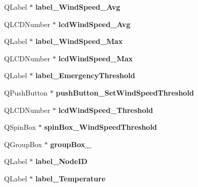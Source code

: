 \begin{DoxyCompactItemize}
Q\+Label $\ast$ {\bfseries label\+\_\+\+Wind\+Speed\+\_\+\+Avg}
\item 
\mbox{\label{class_ui___main_window_afb2874c9b07741da0a89fc4d3c407edf}} 
Q\+L\+C\+D\+Number $\ast$ {\bfseries lcd\+Wind\+Speed\+\_\+\+Avg}
\item 
\mbox{\label{class_ui___main_window_ab459580179842c31da3095ab0f04eeef}} 
Q\+Label $\ast$ {\bfseries label\+\_\+\+Wind\+Speed\+\_\+\+Max}
\item 
\mbox{\label{class_ui___main_window_ace0ed2d952b1c0c1aa41b1456046d7db}} 
Q\+L\+C\+D\+Number $\ast$ {\bfseries lcd\+Wind\+Speed\+\_\+\+Max}
\item 
\mbox{\label{class_ui___main_window_a7170a1d2887350b1c9fd1c4232b06aa0}} 
Q\+Label $\ast$ {\bfseries label\+\_\+\+Emergency\+Threshold}
\item 
\mbox{\label{class_ui___main_window_a3a605343230d7fe43f908ece581638fa}} 
Q\+Push\+Button $\ast$ {\bfseries push\+Button\+\_\+\+Set\+Wind\+Speed\+Threshold}
\item 
\mbox{\label{class_ui___main_window_abafb85072e97c27693c4f87b0734aae0}} 
Q\+L\+C\+D\+Number $\ast$ {\bfseries lcd\+Wind\+Speed\+\_\+\+Threshold}
\item 
\mbox{\label{class_ui___main_window_a61cb22c7321191738ff6a7642baee259}} 
Q\+Spin\+Box $\ast$ {\bfseries spin\+Box\+\_\+\+Wind\+Speed\+Threshold}
\item 
\mbox{\label{class_ui___main_window_a8a860f845b896fc216572b4d41083cb5}} 
Q\+Group\+Box $\ast$ {\bfseries group\+Box\+\_}
\item 
\mbox{\label{class_ui___main_window_a6a0de1b03641f2c06e0a3ca4d031fb04}} 
Q\+Label $\ast$ {\bfseries label\+\_\+\+Node\+ID}
\item 
\mbox{\label{class_ui___main_window_a482b79bc3855bb12275028d38108f57d}} 
Q\+Label $\ast$ {\bfseries label\+\_\+\+Temperature}

\end{DoxyCompactItemize}
